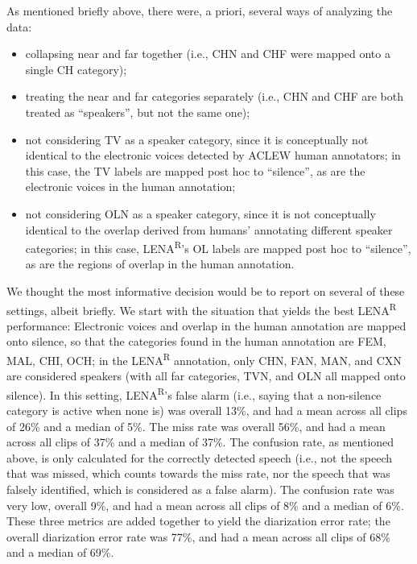 \documentclass[english,table,man,floatsintext]{apa6}
\providecommand{\tightlist}{%
  \setlength{\itemsep}{0pt}\setlength{\parskip}{0pt}}
\begin{document}
As mentioned briefly above, there were, a priori, several ways of analyzing the data:

\begin{itemize}
\tightlist
\item
  collapsing near and far together (i.e., CHN and CHF were mapped onto a single CH category);
\item
  treating the near and far categories separately (i.e., CHN and CHF are both treated as \enquote{speakers}, but not the same one);
\item
  not considering TV as a speaker category, since it is conceptually not identical to the electronic voices detected by ACLEW human annotators; in this case, the TV labels are mapped post hoc to \enquote{silence}, as are the electronic voices in the human annotation;
\item
  not considering OLN as a speaker category, since it is not conceptually identical to the overlap derived from humans' annotating different speaker categories; in this case, LENA\textsuperscript{R}'s OL labels are mapped post hoc to \enquote{silence}, as are the regions of overlap in the human annotation.
\end{itemize}

We thought the most informative decision would be to report on several of these settings, albeit briefly. We start with the situation that yields the best LENA\textsuperscript{R} performance: Electronic voices and overlap in the human annotation are mapped onto silence, so that the categories found in the human annotation are FEM, MAL, CHI, OCH; in the LENA\textsuperscript{R} annotation, only CHN, FAN, MAN, and CXN are considered speakers (with all far categories, TVN, and OLN all mapped onto silence). In this setting, LENA\textsuperscript{R}'s false alarm (i.e., saying that a non-silence category is active when none is) was overall 13\%, and had a mean across all clips of 26\% and a median of 5\%. The miss rate was overall 56\%, and had a mean across all clips of 37\% and a median of 37\%.
The confusion rate, as mentioned above, is only calculated for the correctly detected speech (i.e., not the speech that was missed, which counts towards the miss rate, nor the speech that was falsely identified, which is considered as a false alarm). The confusion rate was very low, overall 9\%, and had a mean across all clips of 8\% and a median of 6\%. These three metrics are added together to yield the diarization error rate; the overall diarization error rate was 77\%, and had a mean across all clips of 68\% and a median of 69\%.
\end{document}
